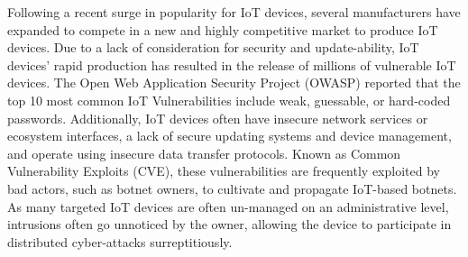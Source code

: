 Following a recent surge in popularity for IoT devices, several manufacturers have expanded to compete in a new and highly competitive market to produce IoT devices. Due to a lack of consideration for security and update-ability, IoT devices' rapid production has resulted in the release of millions of vulnerable IoT devices. The Open Web Application Security Project (OWASP) reported that the top 10 most common IoT Vulnerabilities include weak, guessable, or hard-coded passwords. Additionally, IoT devices often have insecure network services or ecosystem interfaces, a lack of secure updating systems and device management, and operate using insecure data transfer protocols. \citep{Misra2021} Known as Common Vulnerability Exploits (CVE), these vulnerabilities are frequently exploited by bad actors, such as botnet owners, to cultivate and propagate IoT-based botnets. As many targeted IoT devices are often un-managed on an administrative level, intrusions often go unnoticed by the owner, allowing the device to participate in distributed cyber-attacks surreptitiously. 

